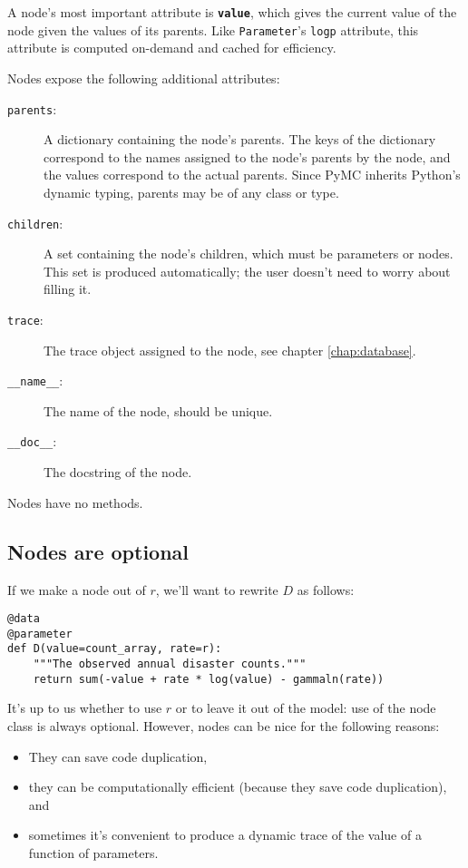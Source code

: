A node's most important attribute is \texttt{\bfseries value}, which gives the current value of the node given the values of its parents. Like \texttt{Parameter}'s \texttt{logp} attribute, this attribute is computed on-demand and cached for efficiency.

Nodes expose the following additional attributes:
\begin{description}
    \item[\texttt{parents}:] A dictionary containing the node's parents. The keys of the dictionary correspond to the names assigned to the node's parents by the node, and the values correspond to the actual parents. Since PyMC inherits Python's dynamic typing, parents may be of any class or type.
    \item[\texttt{children}:] A set containing the node's children, which must be parameters or nodes. This set is produced automatically; the user doesn't need to worry about filling it.
    \item[\texttt{trace}:] The trace object assigned to the node, see chapter \ref{chap:database}.
    \item[\texttt{\_\_name\_\_}:] The name of the node, should be unique.
    \item[\texttt{\_\_doc\_\_}:] The docstring of the node.
\end{description}
Nodes have no methods.

\subsection{Nodes are optional}
If we make a node out of $r$, we'll want to rewrite $D$ as follows:
\begin{verbatim}
@data
@parameter
def D(value=count_array, rate=r):
    """The observed annual disaster counts."""
    return sum(-value + rate * log(value) - gammaln(rate))
\end{verbatim}
It's up to us whether to use $r$ or to leave it out of the model: use of the node class is always optional. However, nodes can be nice for the following reasons:
\begin{itemize}
    \item They can save code duplication,    
    \item they can be computationally efficient (because they save code duplication), and
    \item sometimes it's convenient to produce a dynamic trace of the value of a function of parameters.
\end{itemize}


